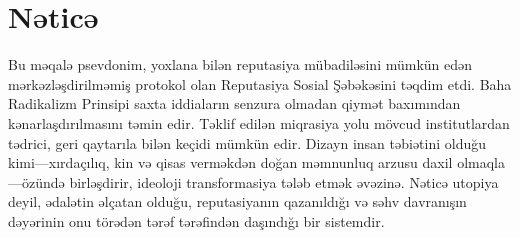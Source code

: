 \documentclass[11pt,a4paper,twocolumn]{article}
\begin{document}
\section{Nəticə}

Bu məqalə psevdonim, yoxlana bilən reputasiya mübadiləsini mümkün edən mərkəzləşdirilməmiş protokol olan Reputasiya Sosial Şəbəkəsini təqdim etdi. Baha Radikalizm Prinsipi saxta iddiaların senzura olmadan qiymət baxımından kənarlaşdırılmasını təmin edir. Təklif edilən miqrasiya yolu mövcud institutlardan tədrici, geri qaytarıla bilən keçidi mümkün edir. Dizayn insan təbiətini olduğu kimi---xırdaçılıq, kin və qisas verməkdən doğan məmnunluq arzusu daxil olmaqla---özündə birləşdirir, ideoloji transformasiya tələb etmək əvəzinə. Nəticə utopiya deyil, ədalətin əlçatan olduğu, reputasiyanın qazanıldığı və səhv davranışın dəyərinin onu törədən tərəf tərəfindən daşındığı bir sistemdir.


\end{document}
